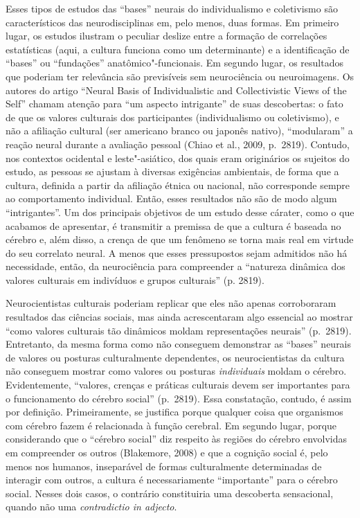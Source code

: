 Esses tipos de estudos das ``bases'' neurais do individualismo e
coletivismo são característicos das neurodisciplinas em, pelo menos,
duas formas. Em primeiro lugar, os estudos ilustram o peculiar deslize
entre a formação de correlações estatísticas (aqui, a cultura funciona
como um determinante) e a identificação de ``bases'' ou ``fundações''
anatômico"-funcionais. Em segundo lugar, os resultados que poderiam ter
relevância são previsíveis sem neurociência ou neuroimagens. Os autores
do artigo ``Neural Basis of Individualistic and Collectivistic Views of
the Self'' chamam atenção para ``um aspecto intrigante'' de suas
descobertas: o fato de que os valores culturais dos participantes
(individualismo ou coletivismo), e não a afiliação cultural (ser
americano branco ou japonês nativo), ``modularam'' a reação neural
durante a avaliação pessoal (Chiao et al., 2009, p.~2819). Contudo, nos
contextos ocidental e leste"-asiático, dos quais eram originários os
sujeitos do estudo, as pessoas se ajustam à diversas exigências
ambientais, de forma que a cultura, definida a partir da afiliação
étnica ou nacional, não corresponde sempre ao comportamento individual.
Então, esses resultados não são de modo algum ``intrigantes''. Um dos
principais objetivos de um estudo desse cárater, como o que acabamos de
apresentar, é transmitir a premissa de que a cultura é baseada no
cérebro e, além disso, a crença de que um fenômeno se torna mais real em
virtude do seu correlato neural. A menos que esses pressupostos sejam
admitidos não há necessidade, então, da neurociência para compreender a
``natureza dinâmica dos valores culturais em indivíduos e grupos
culturais'' (p. 2819).

Neurocientistas culturais poderiam replicar que eles não apenas
corroboraram resultados das ciências sociais, mas ainda acrescentaram
algo essencial ao mostrar ``como valores culturais tão dinâmicos moldam
representações neurais'' (p.~2819). Entretanto, da mesma forma como não
conseguem demonstrar as ``bases'' neurais de valores ou posturas
culturalmente dependentes, os neurocientistas da cultura não conseguem
mostrar como valores ou posturas \emph{individuais} moldam o cérebro.
Evidentemente, ``valores, crenças e práticas culturais devem ser
importantes para o funcionamento do cérebro social'' (p.~2819). Essa
constatação, contudo, é assim por definição. Primeiramente, se justifica
porque qualquer coisa que organismos com cérebro fazem é relacionada à
função cerebral. Em segundo lugar, porque considerando que o ``cérebro
social'' diz respeito às regiões do cérebro envolvidas em compreender os
outros (Blakemore, 2008) e que a cognição social é, pelo menos nos
humanos, inseparável de formas culturalmente determinadas de interagir
com outros, a cultura é necessariamente ``importante'' para o cérebro
social. Nesses dois casos, o contrário constituiria uma descoberta
sensacional, quando não uma \emph{contradictio in adjecto}.

